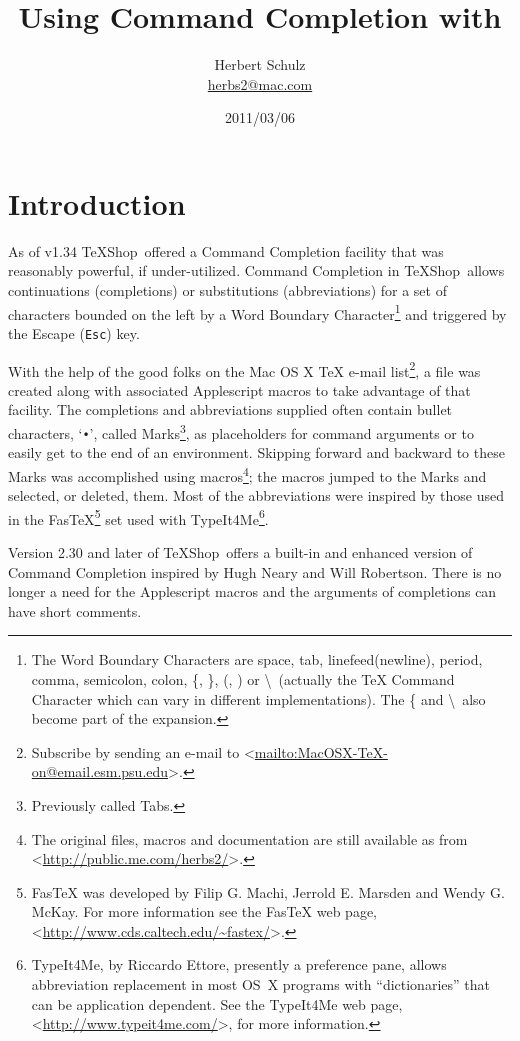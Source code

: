 \documentclass[11pt]{article}
\title{Using Command Completion with \\ \TS}
\author{Herbert Schulz\\\small\href{mailto:herbs2@mac.com}{herbs2@mac.com}}
\date{2011/03/06}
\newcommand{\esckey}{\texttt{Esc}}
\newcommand{\fastex}{Fas\hspace{-.15em}\TeX}
\newcommand{\TS}{\textsf{\TeX Shop}}
\begin{document}
\maketitle
\thispagestyle{empty}

\section*{Introduction}

As of v1.34 \TS\ offered a Command Completion facility that was reasonably powerful, if under-utilized. Command Completion in \TS\ allows continuations (completions) or substitutions (abbreviations) for a set of characters bounded on the left by a \textsf{Word Boundary Character}\footnote{The \textsf{Word Boundary Characters} are space, tab, linefeed(newline), period, comma, semicolon, colon, \{, \}, (, ) or \textbackslash\ (actually the \textsf{TeX Command Character} which can vary in different implementations). The \{ and \textbackslash\ also become part of the expansion.} and triggered by the Escape (\esckey) key.

With the help of the good folks on the \textsf{Mac OS X TeX} e-mail list\footnote{Subscribe by sending an e-mail to <\url{mailto:MacOSX-TeX-on@email.esm.psu.edu}>.}, a  file was created along with associated Applescript macros to take advantage of that facility. The completions and abbreviations supplied often contain bullet characters, `\texttt{•}', called Marks\footnote{Previously called Tabs.}, as placeholders for command arguments or to easily get to the end of an environment. Skipping forward and backward to these Marks was accomplished using macros\footnote{The original  files, macros and documentation are still available as  from  <\url{http://public.me.com/herbs2/}>.}; the macros jumped to the Marks and selected, or deleted, them. Most of the abbreviations were inspired by those used in the \textsf{\fastex}\footnote{\textsf{\fastex} was developed by Filip G. Machi, Jerrold E. Marsden and Wendy G. McKay. For more information see the \textsf{\fastex} web page, <\url{http://www.cds.caltech.edu/~fastex/}>.} set used with \textsf{TypeIt4Me}\footnote{\textsf{TypeIt4Me}, by Riccardo Ettore, presently a preference pane, allows abbreviation replacement in most OS~X programs with ``dictionaries'' that can be application dependent. See the \textsf{TypeIt4Me} web page, <\url{http://www.typeit4me.com/}>, for more information.}.

Version 2.30 and later of \TS\ offers a built-in and enhanced version of Command Completion inspired by Hugh Neary and Will Robertson. There is no longer a need for the Applescript macros and the arguments of completions can have short comments.
\end{document}
